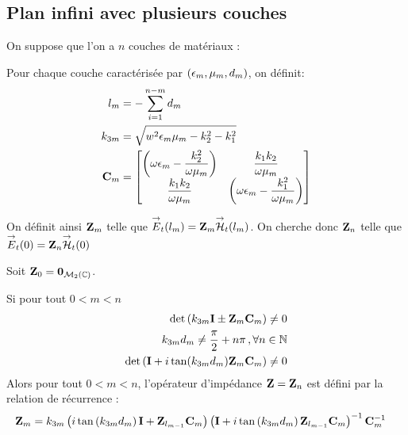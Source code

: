 \subsection{Plan infini avec plusieurs couches}
On suppose que l'on a $n$ couches de matériaux : 

\renewcommand{\z}{e_3}
\renewcommand{\x}{e_1}
\renewcommand{\y}{e_2}
\begin{figure}[h!btp]
    \centering
    \begin{tikzpicture}
        
    \end{tikzpicture}
\end{figure}

Pour chaque couche caractérisée par $(\eps_m,\mu_m,d_m)$, on définit:
\begin{align}
l_m &= -\sum_{i=1}^{n-m} d_{m} 
\\
k_{3m} &= \sqrt{w^2\eps_m\mu_m - k_2^2 - k_1^2}
\\
\mC_m &=
    \begin{bmatrix}
        \left(\w\eps_m-\frac{k_2^2}{\w\mu_m}\right) & \frac{k_1k_2}{\w\mu_m}\\
        \frac{k_1k_2}{\w\mu_m} & \left(\w\eps_m-\frac{k_1^2}{\w\mu_m}\right)
    \end{bmatrix}
\end{align}

On définit ainsi $\mZ_m$ telle que $\vE_t(l_m) = \mZ_m\vH_t(l_m)$. On cherche donc $\mZ_n$ telle que $\vE_t(0) = \mZ_n\vH_t(0)$

\begin{thm}
    Soit $\mZ_0 = \mat{0}_{\mathcal{M}_2(\CC)}$.

    Si pour tout $0<m < n$
        \begin{align}
        \det\left(k_{3m}\mI \pm \mZ_m\mC_m \right) \not = 0 \\
        k_{3m}d_m\not = \frac{\pi}{2}+n\pi\,, \forall n \in \NN \\
        \det\left(\mI + i\tan(k_{3m}d_m)\mZ_m\mC_m\right) \not = 0
    \end{align}
    Alors pour tout $0< m < n$, l'opérateur d'impédance $\mZ =  \mZ_n$ est défini par la relation de récurrence : 
    \begin{align}
    \mZ_m &= k_{3m}
    \left(i\tan\left(k_{3m}d_m\right)\mI + \mZ_{l_{m-1}}\mC_m\right)
    \left(\mI + i\tan\left(k_{3m}d_m\right)\mZ_{l_{m-1}}\mC_m\right)^{-1}
    \mC_m^{-1}
    \end{align}
\end{thm}


